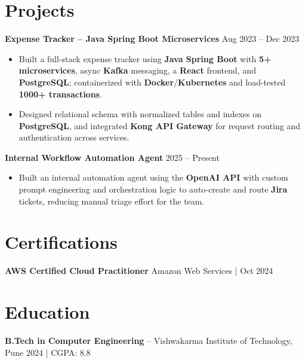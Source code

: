 \documentclass[a4paper,10pt]{article}
\begin{document}
\section*{Projects}

\textbf{Expense Tracker -- Java Spring Boot Microservices} \hfill Aug 2023 -- Dec 2023
\begin{itemize}[leftmargin=*]
    \item Built a full-stack expense tracker using \textbf{Java Spring Boot} with \textbf{5+ microservices}, async \textbf{Kafka} messaging, a \textbf{React} frontend, and \textbf{PostgreSQL}; containerized with \textbf{Docker}/\textbf{Kubernetes} and load-tested \textbf{1000+ transactions}.
    \item Designed relational schema with normalized tables and indexes on \textbf{PostgreSQL}, and integrated \textbf{Kong API Gateway} for request routing and authentication across services.
\end{itemize}

\textbf{Internal Workflow Automation Agent} \hfill 2025 -- Present
\begin{itemize}[leftmargin=*]
    \item Built an internal automation agent using the \textbf{OpenAI API} with custom prompt engineering and orchestration logic to auto-create and route \textbf{Jira} tickets, reducing manual triage effort for the team.
\end{itemize}

\section*{Certifications}
\textbf{AWS Certified Cloud Practitioner} \hfill Amazon Web Services \;|\; Oct 2024

\section*{Education}
\textbf{B.Tech in Computer Engineering} -- Vishwakarma Institute of Technology, Pune \hfill 2024 \;|\; CGPA: 8.8
\end{document}
